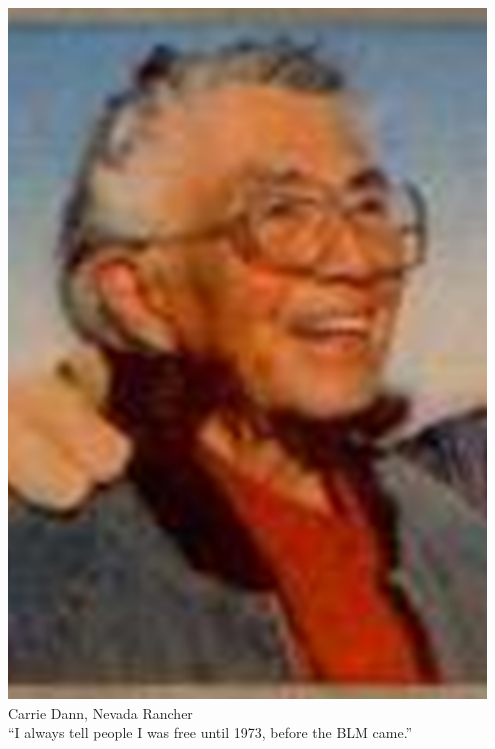 \begin{frame}
    \begin{columns}[onlytextwidth]
            \centering
            \includegraphics[width=0.95\textwidth]{img/carrie-dann.png} \\
            Carrie Dann, Nevada Rancher \\

            ``I always tell people I was free until 1973, before the BLM came.''
    \end{columns}
\end{frame}

